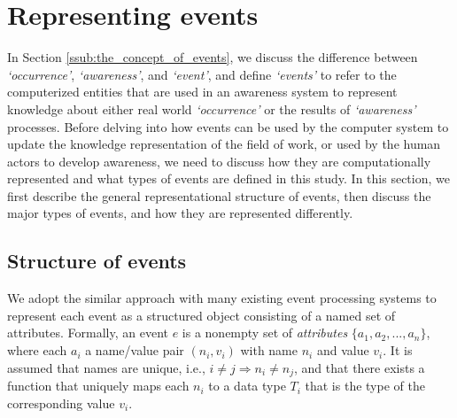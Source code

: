 

\section{Representing events} %
\label{sec:representing_events}
In Section \ref{ssub:the_concept_of_events}, we discuss the difference between \emph{`occurrence'}, \emph{`awareness'}, and \emph{`event'}, and define \emph{`events'} to refer to the computerized entities that are used in an awareness system to represent knowledge about either real world \emph{`occurrence'} or the results of \emph{`awareness'} processes. Before delving into how events can be used by the computer system to update the knowledge representation of the field of work, or used by the human actors to develop awareness, we need to discuss how they are computationally represented and what types of events are defined in this study. In this section, we first describe the general representational structure of events, then discuss the major types of events, and how they are represented differently.

\subsection{Structure of events} %
\label{sub:defining_events}
We adopt the similar approach with many existing event processing systems \cite{Mhl2010} to represent each event as a structured object consisting of a named set of attributes. Formally, an event $e$ is a nonempty set of \emph{attributes} $\{a_1, a_2, ..., a_n\}$, where each $a_i$ a name/value pair $(n_i, v_i)$ with name $n_i$ and value $v_i$. It is assumed that names are unique, i.e., $i\ne j \Rightarrow n_i\ne n_j$, and that there exists a function that uniquely maps each $n_i$ to a data type $T_i$ that is the type of the corresponding value $v_i$.

